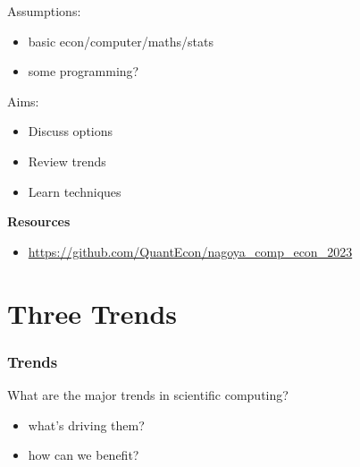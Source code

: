 \documentclass[
    xcolor={svgnames,dvipsnames},
    hyperref={colorlinks, citecolor=DeepPink4, linkcolor=DarkRed, urlcolor=DarkBlue}
    ]{beamer}  %
\newcommand{\1}{\mathbbm 1}
\begin{document}
\begin{frame}


    Assumptions:

    \begin{itemize}
        \item basic econ/computer/maths/stats 
        \vspace{0.3em}
        \item some programming?
    \end{itemize}

    \vspace{0.3em}
    \vspace{0.5em}
    Aims:

    \begin{itemize}
        \item Discuss options
        \vspace{0.5em}
        \item Review trends
        \vspace{0.5em}
        \item Learn techniques
    \end{itemize}

    \vspace{0.5em}
    \vspace{0.5em}
    \textbf{Resources}

    \begin{itemize}
        \item \url{https://github.com/QuantEcon/nagoya_comp_econ_2023}
    \end{itemize}


\end{frame}




\section{Three Trends}

\begin{frame}
    \frametitle{Trends}

    What are the major trends in scientific computing?

    \vspace{0.5em}
    \vspace{0.5em}

    \begin{itemize}
        \item what's driving them?
        \vspace{0.5em}
        \item how can we benefit?
    \end{itemize}
\end{frame}
\end{document}
